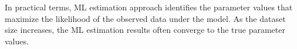 In practical terms, ML estimation approach identifies the parameter values that maximize the likelihood of the observed data under the model. As the dataset size increases, the ML estimation results often converge to the true parameter values.
